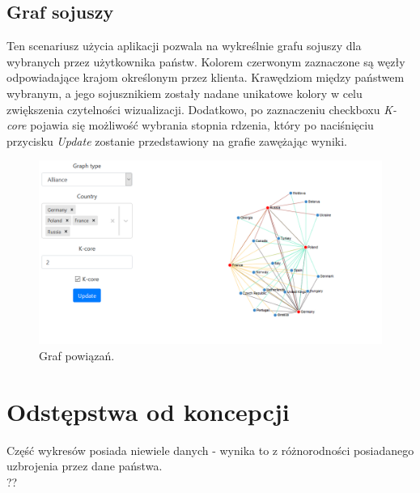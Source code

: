 \subsection{Graf sojuszy}
Ten scenariusz użycia aplikacji pozwala na wykreślnie grafu sojuszy dla wybranych przez użytkownika państw. Kolorem czerwonym zaznaczone są węzły odpowiadające krajom określonym przez klienta. Krawędziom między państwem wybranym, a jego sojusznikiem zostały nadane unikatowe kolory w celu zwiększenia czytelności wizualizacji. Dodatkowo, po zaznaczeniu checkboxu \textit{K-core} pojawia się możliwość wybrania stopnia rdzenia, który po naciśnięciu przycisku \textit{Update} zostanie przedstawiony na grafie zawężając wyniki. 
\begin{figure}[H]
    \centering \includegraphics[width=0.8\linewidth]{tex/alliance.PNG}
    \caption{Graf powiązań.}
    \label{fig:alliance_graph}
\end{figure}

\section{Odstępstwa od koncepcji}
Część wykresów posiada niewiele danych - wynika to z różnorodności posiadanego uzbrojenia przez dane państwa.
\\??